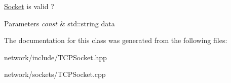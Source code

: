 \hyperlink{class_socket}{Socket} is valid ? 


\begin{DoxyParams}{Parameters}
{\em const} & std\+::string data \\
\hline
\end{DoxyParams}


The documentation for this class was generated from the following files\+:\begin{DoxyCompactItemize}
\item 
network/include/T\+C\+P\+Socket.\+hpp\item 
network/sockets/T\+C\+P\+Socket.\+cpp\end{DoxyCompactItemize}
